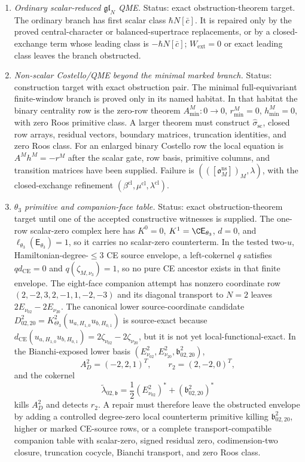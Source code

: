 \begin{enumerate}
  \item \emph{Ordinary scalar-reduced \(\mathfrak{gl}_N\) QME.}
  Status: exact obstruction-theorem target.  The ordinary branch has first
  scalar class \(\hbar N[\bar c]\).  It is repaired only by the proved
  central-character or balanced-supertrace replacements, or by a
  closed-exchange term whose leading class is \(-\hbar N[\bar c]\);
  \(W_{\mathrm{ext}}=0\) or exact leading class leaves the branch
  obstructed.

  \item \emph{Non-scalar Costello/QME beyond the minimal marked branch.}
  Status: construction target with exact obstruction pair.  The minimal
  full-equivariant finite-window branch is proved only in its named
  habitat.  In that habitat the binary centrality row is the zero-row
  theorem
  \(A^M_{\min}:0\to0\), \(r^M_{\min}=0\), \(h^M_{\min}=0\), with zero
  Roos primitive class.  A larger theorem must construct
  \(\widehat\sigma_{\mathrm{sc}}\),
  closed row arrays, residual vectors, boundary matrices, truncation
  identities, and zero Roos class.  For an enlarged binary Costello row
  the local equation is \(A^Mh^M=-r^M\) after the scalar gate, row basis,
  primitive columns, and transition matrices have been supplied.  Failure is
  \((([\mathfrak o^{\mathrm{ns}}_M])_M,\lambda)\), with the
  closed-exchange refinement
  \((\beta^{\mathrm{cl}},\mu^{\mathrm{cl}},\lambda^{\mathrm{cl}})\).

  \item \emph{\(\theta_3\) primitive and companion-face table.}
  Status: exact obstruction-theorem target until one of the accepted
  constructive witnesses is supplied.  The one-row scalar-zero complex
  here has \(K^0=0\), \(K^1=\C\mathsf E_{\theta_3}\), \(d=0\), and
  \(\ell_{\theta_3}(\mathsf E_{\theta_3})=1\), so it carries no
  scalar-zero counterterm.  In the
  tested two-\(u\), Hamiltonian-degree-\(\le3\) CE source envelope, a
  left-cokernel \(q\) satisfies \(qd_{\mathrm{CE}}=0\) and
  \(q(\zeta_{M,\nu_3})=1\), so no pure CE ancestor exists in that finite
  envelope.  The eight-face companion attempt has nonzero coordinate row
  \((2,-2,3,2,-1,1,-2,-3)\) and its diagonal transport to \(N=2\)
  leaves \(2E_{\nu_{02}}-2E_{\nu_{20}}\).  The canonical lower
  source-coordinate candidate
  \(D^2_{02,20}=K^2_{\Theta_3}
  (u_{a,H_{1,0}}u_{b,H_{0,1}})\) is source-exact because
  \(d_{\mathrm{CE}}(u_{a,H_{1,0}}u_{b,H_{0,1}})
  =2\zeta_{\nu_{02}}-2\zeta_{\nu_{20}}\), but it is not yet
  local-functional-exact.  In the Bianchi-exposed lower basis
  \((E^2_{\nu_{02}},E^2_{\nu_{20}},\mathfrak b^2_{02,20})\),
  \[
    A_D^2=(-2,2,1)^T,\qquad r_2=(2,-2,0)^T,
  \]
  and the cokernel
  \[
    \widetilde\lambda_{02,\mathfrak b}
    =
    \frac12(E^2_{\nu_{02}})^*
    +(\mathfrak b^2_{02,20})^*
  \]
  kills \(A_D^2\) and detects \(r_2\).  A repair must therefore leave
  the obstructed envelope by adding a controlled degree-zero local
  counterterm primitive killing \(\mathfrak b^2_{02,20}\), higher or
  marked CE-source rows, or a complete transport-compatible companion
  table with scalar-zero, signed residual zero, codimension-two closure,
  truncation cocycle, Bianchi transport, and zero Roos class.


\end{enumerate}
